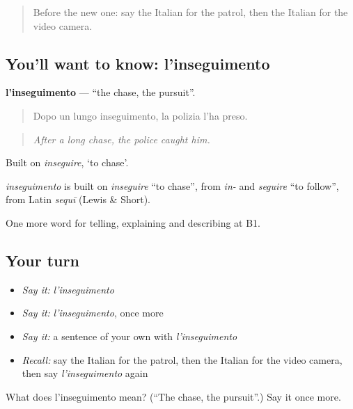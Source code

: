 \label{lesson:IT-C294-inseguimento}



\begin{quote}
Before the new one: say the Italian for the patrol, then the Italian for the video camera.
\end{quote}

\subsection*{You'll want to know: l'inseguimento}
\textbf{l'inseguimento} — \textquotedblleft{}the chase, the pursuit\textquotedblright{}.

\begin{quote}
Dopo un lungo inseguimento, la polizia l'ha preso.
\end{quote}

\begin{quote}
\emph{After a long chase, the police caught him.}
\end{quote}

Built on \emph{inseguire}, ‘to chase’.

\begin{cousinweb}
\emph{inseguimento} is built on \emph{inseguire} \textquotedblleft{}to chase\textquotedblright{}, from \emph{in-} and \emph{seguire} \textquotedblleft{}to follow\textquotedblright{}, from Latin \emph{sequī} (Lewis \& Short).
\end{cousinweb}

\begin{grammarlens}[title={What you've built}]
One more word for telling, explaining and describing at B1.
\end{grammarlens}

\subsection*{Your turn}
\begin{itemize}
\raggedright
  \item \emph{Say it:} \emph{l'inseguimento}
  \item \emph{Say it:} \emph{l'inseguimento}, once more
  \item \emph{Say it:} a sentence of your own with \emph{l'inseguimento}
  \item \emph{Recall:} say the Italian for the patrol, then the Italian for the video camera, then say \emph{l'inseguimento} again
\end{itemize}

\begin{tcolorbox}[breakable,colback=teal!4,colframe=teal!35!black,title={Before you move on}]
What does l'inseguimento mean? (\textquotedblleft{}The chase, the pursuit\textquotedblright{}.) Say it once more.
\end{tcolorbox}
